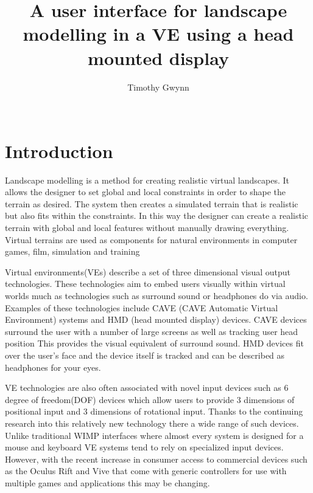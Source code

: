 \documentclass{sig-alternate-05-2015}
\begin{document}
\title{A user interface for landscape modelling in a VE using a head mounted display}

\author{
\alignauthor
Timothy Gwynn\\
       \\
}
\maketitle
\begin{CCSXML}

\end{CCSXML}



\printccsdesc
{}
\begin{abstract}
	
\end{abstract}
\section{Introduction}
Landscape modelling is a method for creating realistic virtual landscapes. It allows the designer to set global and local constraints in order to shape the terrain as desired. The system then creates a simulated terrain that is realistic but also fits within the constraints. In this way the designer can create a realistic terrain with global and local features without manually drawing everything. Virtual terrains are used as components for natural environments in computer games, film, simulation and training\cite{Gain2015}

Virtual environments(VEs) describe a set of three dimensional visual output technologies. These technologies aim to embed users visually within virtual worlds much as technologies such as surround sound or headphones do via audio. Examples of these technologies include CAVE (CAVE Automatic Virtual
Environment)  systems and HMD (head mounted display) devices.
CAVE devices surround the user with a number of large screens as well as tracking user head position\cite{Cruz-Neira1993} This provides the visual equivalent of surround sound. HMD devices fit over the user's face and the device itself is tracked and can be described as headphones for your eyes.\cite{Alger2015}

VE technologies are also often associated with novel input devices such as 6 degree of freedom(DOF) devices which allow users to provide 3 dimensions of positional input and 3 dimensions of rotational input. Thanks to the continuing research into this relatively new technology there a wide range of such devices. Unlike traditional WIMP interfaces where almost every system is designed for a mouse and keyboard VE systems tend to rely on specialized input devices\cite{Hand1997,Bowman2001}. However, with the recent increase in consumer access to commercial devices such as the Oculus Rift and Vive that come with generic controllers for use with multiple games and applications this may be changing.
\end{document}
